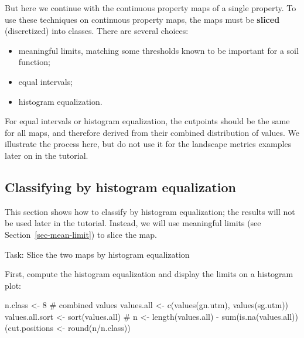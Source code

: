 \documentclass[
  letterpaper,
  DIV=11,
  numbers=noendperiod]{scrartcl}
\newenvironment{Shaded}{\begin{snugshade}}{\end{snugshade}}
\newcommand{\CommentTok}[1]{\textcolor[rgb]{0.37,0.37,0.37}{#1}}
\newcommand{\DecValTok}[1]{\textcolor[rgb]{0.68,0.00,0.00}{#1}}
\newcommand{\FunctionTok}[1]{\textcolor[rgb]{0.28,0.35,0.67}{#1}}
\newcommand{\NormalTok}[1]{\textcolor[rgb]{0.00,0.23,0.31}{#1}}
\newcommand{\OtherTok}[1]{\textcolor[rgb]{0.00,0.23,0.31}{#1}}
\newcommand{\SpecialCharTok}[1]{\textcolor[rgb]{0.37,0.37,0.37}{#1}}
\providecommand{\tightlist}{%
  \setlength{\itemsep}{0pt}\setlength{\parskip}{0pt}}\usepackage{longtable,booktabs,array}
\begin{document}
But here we continue with the continuous property maps of a single
property. To use these techniques on continuous property maps, the maps
must be \textbf{sliced} (discretized) into classes. There are several
choices:

\begin{itemize}
\tightlist
\item
  meaningful limits, matching some thresholds known to be important for
  a soil function;
\item
  equal intervals;
\item
  histogram equalization.
\end{itemize}

For equal intervals or histogram equalization, the cutpoints should be
the same for all maps, and therefore derived from their combined
distribution of values. We illustrate the process here, but do not use
it for the landscape metrics examples later on in the tutorial.

\hypertarget{sec-hist-equal}{%
\subsection{Classifying by histogram
equalization}\label{sec-hist-equal}}

This section shows how to classify by histogram equalization; the
results will not be used later in the tutorial. Instead, we will use
meaningful limits (see Section~\ref{sec-mean-limit}) to slice the map.

Task: Slice the two maps by histogram equalization

First, compute the histogram equalization and display the limits on a
histogram plot:

\begin{Shaded}
\begin{Highlighting}[]
\NormalTok{n.class }\OtherTok{\textless{}{-}} \DecValTok{8}
\CommentTok{\# combined values}
\NormalTok{values.all }\OtherTok{\textless{}{-}} \FunctionTok{c}\NormalTok{(}\FunctionTok{values}\NormalTok{(gn.utm),}
                \FunctionTok{values}\NormalTok{(sg.utm))}
\NormalTok{values.all.sort }\OtherTok{\textless{}{-}} \FunctionTok{sort}\NormalTok{(values.all)}
\CommentTok{\#}
\NormalTok{n }\OtherTok{\textless{}{-}} \FunctionTok{length}\NormalTok{(values.all) }\SpecialCharTok{{-}} \FunctionTok{sum}\NormalTok{(}\FunctionTok{is.na}\NormalTok{(values.all))}
\NormalTok{(cut.positions }\OtherTok{\textless{}{-}} \FunctionTok{round}\NormalTok{(n}\SpecialCharTok{/}\NormalTok{n.class))}
\end{Highlighting}
\end{Shaded}
\end{document}
